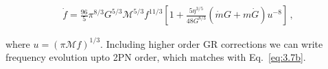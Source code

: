 \documentclass[prd,twocolumn,nofootinbib]{revtex4-1}
\begin{document}
 \begin{align} 
 \dot{f}=\frac{96}{5}\pi^{8/3}G^{5/3}\mathcal{M}^{5/3}f^{11/3}[1+\frac{5\eta^{3/5}}{48 G^{8/3}}(\dot{m}G+m\dot{G})u^{-8}]\,,
 \end{align} 
 
 
 where $u=(\pi \mathcal{M}f)^{1/3}$. Including higher order GR corrections we can write frequency evolution upto 2PN order, which matches with Eq.~\eqref{eq:3.7b}.
 
\end{document}
